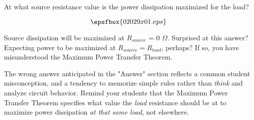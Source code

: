 

At what source resistance value is the power dissipation maximized for the load?

$$\epsfbox{02029x01.eps}$$







Source dissipation will be maximized at $R_{source}$ = 0 $\Omega$.  Surprised at this answer?  Expecting power to be maximized at $R_{source} = R_{load}$, perhaps?  If so, you have misunderstood the Maximum Power Transfer Theorem.







The wrong answer anticipated in the "Answer" section reflects a common student misconception, and a tendency to memorize simple rules rather than {\it think} and analyze circuit behavior.  Remind your students that the Maximum Power Transfer Theorem specifies what value the {\it load} resistance should be at to maximize power dissipation {\it at that same load}, not elsewhere.





